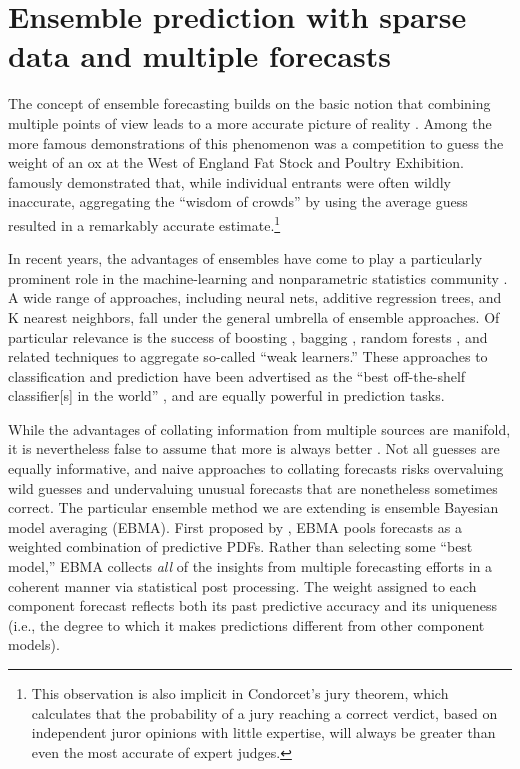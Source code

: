 \documentclass[12pt,fullpage,endnotes]{article}
\begin{document}
\section{Ensemble prediction with sparse data and multiple forecasts }
\label{theproblem}

The concept of ensemble forecasting builds on the basic notion that
combining multiple points of view leads to a more accurate picture of
reality \citep[c.f.,][]{Surowiecki:2004}.  Among the more famous
demonstrations of this phenomenon was a competition to guess the
weight of an ox at the West of England Fat Stock and Poultry
Exhibition.  \citet{Galton:1907} famously demonstrated that, while
individual entrants were often wildly inaccurate, aggregating the
``wisdom of crowds'' by using the average guess resulted in a
remarkably accurate estimate.\footnote{This observation is also
  implicit in Condorcet's jury theorem, which calculates that the probability
  of a jury reaching a correct verdict, based on independent juror
  opinions with little expertise, will always be greater than even the
  most accurate of expert judges.}

In recent years, the advantages of ensembles have come to play a
particularly prominent role in the machine-learning and nonparametric
statistics community \citep{Hastie:2009}. A wide range of approaches,
including neural nets, additive regression trees, and K nearest
neighbors, fall under the general umbrella of ensemble approaches.  Of
particular relevance is the success of boosting \citep{Freund:1997,
  Friedman:2001}, bagging \citep{Breiman:1996}, random forests
\citep{Breiman:2001}, and related techniques
\citep[e.g.,][]{Chipman:2010} to aggregate so-called ``weak
learners.''  These approaches to classification and prediction have
been advertised as the ``best off-the-shelf classifier[s] in the
world'' \citep{Breiman:1996}, and are equally powerful in prediction
tasks.

While the advantages of collating information from multiple sources
are manifold, it is nevertheless false to assume that more is always
better \citep[c.f.,][]{Page:2011}.  Not all guesses are equally
informative, and naive approaches to collating forecasts risks
overvaluing wild guesses and undervaluing unusual forecasts that are
nonetheless sometimes correct.  The particular ensemble method we are
extending is ensemble Bayesian model averaging (EBMA). First proposed
by \citet{Raftery:2005}, EBMA pools forecasts as a weighted
combination of predictive PDFs.  Rather than selecting some ``best
model,'' EBMA collects \textit{all} of the insights from multiple
forecasting efforts in a coherent manner via statistical post
processing.  The weight assigned to each component forecast reflects
both its past predictive accuracy and its uniqueness (i.e., the degree
to which it makes predictions different from other component models).
\end{document}
